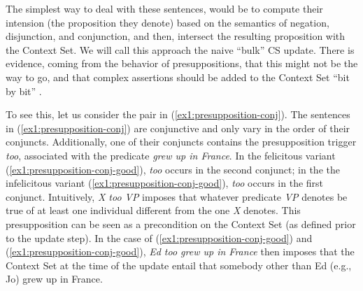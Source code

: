 The simplest way to deal with these sentences, would be to compute their intension (the proposition they denote) based on the semantics of negation, disjunction, and conjunction, and then, intersect the resulting proposition with the Context Set. We will call this approach the naive ``bulk'' CS update. There is evidence, coming from the behavior of presuppositions, that this might not be the way to go, and that complex assertions should be added to the Context Set ``bit by bit'' \citep{Heim1982,Heim1983a,Heim1983b}.

To see this, let us consider the pair in (\ref{ex1:presupposition-conj}). The sentences in (\ref{ex1:presupposition-conj}) are conjunctive and only vary in the order of their conjuncts. Additionally, one of their conjuncts contains the presupposition trigger \textit{too}, associated with the predicate \textit{grew up in France}. In the felicitous variant (\ref{ex1:presupposition-conj-good}), \textit{too} occurs in the second conjunct; in the the infelicitous variant (\ref{ex1:presupposition-conj-good}), \textit{too} occurs in the first conjunct. Intuitively, \textit{X too VP} imposes that whatever predicate \textit{VP} denotes be true of at least one individual different from the one \textit{X} denotes. This presupposition can be seen as a precondition on the Context Set (as defined prior to the update step). In the case of (\ref{ex1:presupposition-conj-good}) and (\ref{ex1:presupposition-conj-good}), \textit{Ed too grew up in France} then imposes that the Context Set at the time of the update entail that somebody other than Ed (e.g., Jo) grew up in France. 

\begin{exe}
	\ex \label{ex1:presupposition-conj}
	\begin{xlist}
		\label{ex1:presupposition-conj-good}
		\label{ex1:presupposition-conj-bad}
	\end{xlist}
\end{exe}

